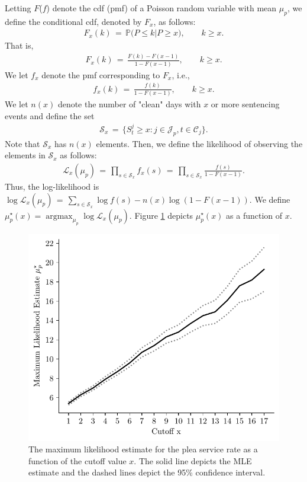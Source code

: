 \documentclass[11pt, oneside]{article}   	%
\theoremstyle{ModifiedStyle}
\DeclareMathOperator*{\argmax}{argmax}
\begin{document}
Letting $F$($f$)  denote the cdf (pmf) of a Poisson random variable with mean $\mu_p$, we define the conditional cdf, denoted by $F_x$, as follows:
\begin{align*}
	F_x(k) \,=\, \mathbb{P}\big( P \leq k | P \geq x \big), \quad\quad k\geq x.
\end{align*}
That is,
\begin{align*}
	F_x(k) \,=\, \frac{F(k)-F(x-1)}{1-F(x-1)}, \quad\quad k\geq x.
\end{align*}
We let $f_x$ denote the pmf corresponding to $F_x$, i.e.,
\begin{align*}
	f_x(k) \,=\, \frac{f(k)}{1-F(x-1)}, \quad\quad k \geq x.
\end{align*}
We let $n(x)$ denote the number of "clean" days with $x$ or more sentencing events and define the set
\begin{align*}
	\mathcal{S}_x \,=\, \{ S^j_t \geq x: j\in\mathcal{J}_p,t\in\mathcal{C}_j \}.
\end{align*}
Note that $\mathcal{S}_x$ has $n(x)$ elements. Then, we define the likelihood of observing the elements in $\mathcal{S}_x$ as follows:
\begin{align*}
	\mathcal{L}_x(\mu_p) \,=\, \prod_{s\in\mathcal{S}_x} f_x(s) \,=\, \prod_{s\in\mathcal{S}_x} \frac{f(s)}{1-F(x-1)}.
\end{align*}
Thus, the log-likelihood is $\log \mathcal{L}_x(\mu_p) \,=\, \sum_{s\in\mathcal{S}_x} \log f(s) - n(x) \log (1-F(x-1))$. We define $\mu^\star_p(x) = \argmax_{\mu_p} \log \mathcal{L}_x(\mu_p)$. Figure \ref{Figure_Plea_Service_Rate_MLE_Estimate} depicts $\mu^\star_p(x)$ as a function of $x$.
%
\begin{figure}[H]
	\centering
	\includegraphics[scale=0.75]{Figures/Likelihood_Estiamtes_Top}
	\vspace{-2mm}
	\caption{The maximum likelihood estimate for the plea service rate as a function of the cutoff value $x$. The solid line depicts the MLE estimate and the dashed lines depict the 95\% confidence interval.}
	\label{Figure_Plea_Service_Rate_MLE_Estimate}
\end{figure}
\end{document}
